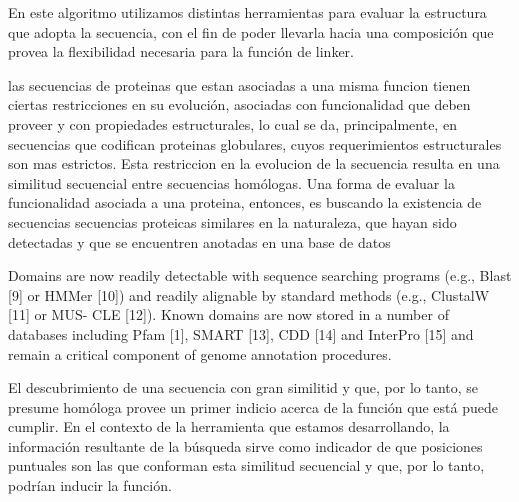 En este algoritmo utilizamos distintas herramientas para evaluar la estructura que adopta la secuencia, con el fin de poder llevarla hacia una composición que provea la flexibilidad
necesaria para la función de linker. 





las secuencias de proteinas que estan asociadas a una misma funcion tienen ciertas restricciones en su evolución, 
asociadas con funcionalidad que deben proveer y con propiedades estructurales, lo cual se da, 
principalmente, en secuencias que codifican proteinas globulares, cuyos requerimientos estructurales son mas estrictos. 
Esta restriccion en la evolucion de la secuencia resulta en una similitud secuencial entre secuencias homólogas.
Una forma de evaluar la funcionalidad asociada a una proteina, entonces, es buscando la existencia de secuencias secuencias proteicas similares en la naturaleza, que hayan sido detectadas y que se encuentren anotadas en una base de datos

Domains are now readily detectable with sequence searching programs (e.g., Blast [9] or HMMer [10]) and readily alignable by standard methods (e.g., ClustalW [11] or MUS-
CLE [12]). Known domains are now stored in a number of databases including Pfam [1], SMART [13], CDD [14] and
InterPro [15] and remain a critical component of genome annotation procedures. 

El descubrimiento de una secuencia con gran similitid y que, por lo tanto, se presume homóloga provee un primer indicio acerca de la función que está puede cumplir. 
En el contexto de la herramienta que estamos desarrollando, la información resultante de la búsqueda sirve como indicador de que posiciones puntuales son las que conforman esta similitud secuencial y que, por lo tanto, podrían inducir la función. 

